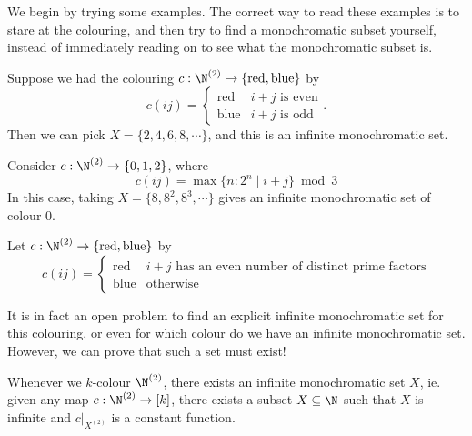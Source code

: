\documentclass[a4paper]{article}
\begin{document}
We begin by trying some examples. The correct way to read these examples is to stare at the colouring, and then try to find a monochromatic subset yourself, instead of immediately reading on to see what the monochromatic subset is.
\begin{eg}
  Suppose we had the colouring $c: \N^{(2)} \to \{\mathrm{red}, \mathrm{blue}\}$ by
  \[
    c(ij) =
    \begin{cases}
      \mathrm{red} & i + j \text{ is even}\\
      \mathrm{blue} & i + j \text{ is odd}
    \end{cases}.
  \]
  Then we can pick $X = \{2, 4, 6, 8, \cdots \}$, and this is an infinite monochromatic set.
\end{eg}

\begin{eg}
  Consider $c: \N^{(2)} \to \{0, 1, 2\}$, where
  \[
    c(ij) = \max \{n: 2^n \mid i + j\} \bmod 3
  \]
  In this case, taking $X = \{8, 8^2, 8^3, \cdots\}$ gives an infinite monochromatic set of colour $0$.
\end{eg}

\begin{eg}
  Let $c: \N^{(2)} \to \{\mathrm{red}, \mathrm{blue}\}$ by
  \[
    c(ij) =
    \begin{cases}
      \mathrm{red} & i + j\text{ has an even number of distinct prime factors}\\
      \mathrm{blue} & \mathrm{otherwise}
    \end{cases}
  \]
\end{eg}
It is in fact an open problem to find an explicit infinite monochromatic set for this colouring, or even for which colour do we have an infinite monochromatic set. However, we can prove that such a set must exist!

\begin{thm}
  Whenever we $k$-colour $\N^{(2)}$, there exists an infinite monochromatic set $X$, ie. given any map $c: \N^{(2)} \to [k]$, there exists a subset $X \subseteq \N$ such that $X$ is infinite and $c|_{X^{(2)}}$ is a constant function.
\end{thm}
\end{document}

